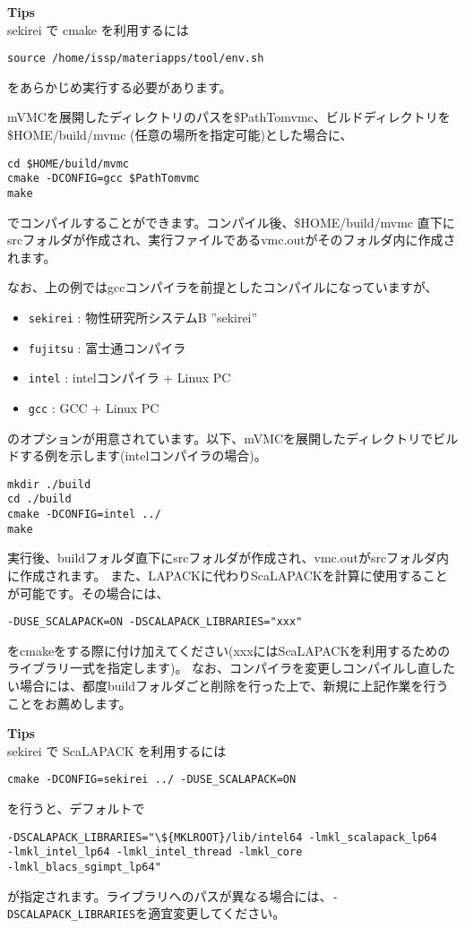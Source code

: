 \begin{screen}
\Large 
{\bf Tips}
\normalsize\\
sekirei で cmake を利用するには
\begin{verbatim}
source /home/issp/materiapps/tool/env.sh
\end{verbatim}
をあらかじめ実行する必要があります。
\end{screen}

mVMCを展開したディレクトリのパスを\$PathTomvmc、ビルドディレクトリを\$HOME/build/mvmc (任意の場所を指定可能)とした場合に、
\begin{verbatim}
cd $HOME/build/mvmc
cmake -DCONFIG=gcc $PathTomvmc
make
\end{verbatim}
でコンパイルすることができます。コンパイル後、\$HOME/build/mvmc 直下にsrcフォルダが作成され、実行ファイルであるvmc.outがそのフォルダ内に作成されます。

なお、上の例ではgccコンパイラを前提としたコンパイルになっていますが、
\begin{itemize}
\item \verb|sekirei| : 物性研究所システムB ''sekirei''
\item \verb|fujitsu| : 富士通コンパイラ
\item \verb|intel| : intelコンパイラ + Linux PC
\item \verb|gcc| : GCC + Linux PC
\end{itemize}
のオプションが用意されています。以下、mVMCを展開したディレクトリでビルドする例を示します(intelコンパイラの場合)。
\begin{verbatim}
mkdir ./build
cd ./build
cmake -DCONFIG=intel ../
make
\end{verbatim}
実行後、buildフォルダ直下にsrcフォルダが作成され、vmc.outがsrcフォルダ内に作成されます。
また、LAPACKに代わりScaLAPACKを計算に使用することが可能です。その場合には、
\begin{verbatim}
-DUSE_SCALAPACK=ON -DSCALAPACK_LIBRARIES="xxx"
\end{verbatim}
をcmakeをする際に付け加えてください(xxxにはScaLAPACKを利用するためのライブラリ一式を指定します)。
なお、コンパイラを変更しコンパイルし直したい場合には、都度buildフォルダごと削除を行った上で、新規に上記作業を行うことをお薦めします。

\begin{screen}
\Large 
{\bf Tips}
\normalsize\\
sekirei で ScaLAPACK を利用するには
\begin{verbatim}
cmake -DCONFIG=sekirei ../ -DUSE_SCALAPACK=ON
\end{verbatim}
を行うと、デフォルトで
\begin{verbatim}
-DSCALAPACK_LIBRARIES="\${MKLROOT}/lib/intel64 -lmkl_scalapack_lp64 
-lmkl_intel_lp64 -lmkl_intel_thread -lmkl_core
-lmkl_blacs_sgimpt_lp64"
\end{verbatim}
が指定されます。ライブラリへのパスが異なる場合には、\verb$-DSCALAPACK_LIBRARIES$を適宜変更してください。
\end{screen}

